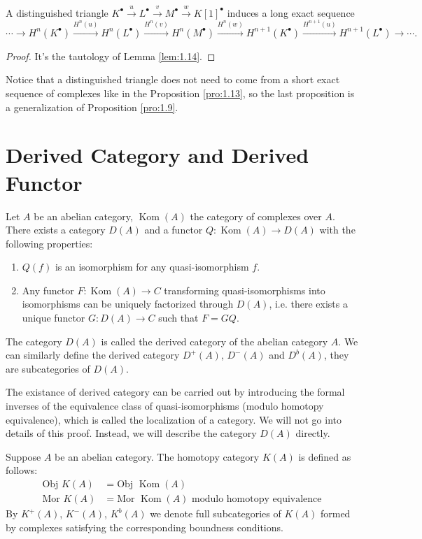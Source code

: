 \begin{pro}
	A distinguished triangle $K^\bullet \xrightarrow{u}L^\bullet\xrightarrow{v}M^\bullet 
	\xrightarrow{w}K[1]^\bullet$ induces a long exact sequence
	\[
		\cdots\to H^n(K^\bullet)\xrightarrow{H^n(u)}H^n(L^\bullet)\xrightarrow{H^n(v)}H^n(M^\bullet)\xrightarrow{H^n(w)}H^{n+1}(K^\bullet)\xrightarrow{H^{n+1}(u)}H^{n+1}(L^\bullet)\to\cdots.
	\]
\end{pro}

\begin{proof}
	It's the tautology of Lemma \ref{lem:1.14}.
\end{proof}

Notice that a distinguished triangle does not need to come from a short exact sequence of complexes like in the Proposition \ref{pro:1.13}, so the last proposition is a generalization of Proposition \ref{pro:1.9}.

\section{Derived Category and Derived Functor}

\begin{definition}
	Let $A$ be an abelian category, $\operatorname{Kom}(A)$ the 
	category of complexes over $A$. There exists a category 
	$D(A)$ and a functor $Q:\operatorname{Kom}(A)\to D(A)$
	with the following properties:
	\begin{enumerate}
		\item $Q(f)$ is an isomorphism for any quasi-isomorphism $f$.
		\item Any functor $F:\operatorname{Kom}(A)\to C$ transforming
			quasi-isomorphisms into isomorphisms can be uniquely
			factorized through $D(A)$, i.e. there exists a unique 
			functor $G:D(A)\to C$ such that $F=GQ$.
	\end{enumerate}
	The category $D(A)$ is called the derived category of the abelian
	category $A$. We can similarly define the derived category $D^+(A)$, $D^-(A)$ and 
	$D^b(A)$, they are subcategories of $D(A)$.
\end{definition}

The existance of derived category can be carried out by introducing 
the formal inverses of the equivalence class of quasi-isomorphisms 
(modulo homotopy equivalence), which is called the 
localization of a category. We will not go into details of this proof.
Instead, we will describe the category $D(A)$ directly.

\begin{definition}
	Suppose $A$ be an abelian category. The homotopy category $K(A)$ is defined as follows:
	\[
		\begin{aligned}
			\text{Obj $K(A)$} &= \text{Obj $\operatorname{Kom}(A)$}\\
			\text{Mor $K(A)$} &= \text{Mor $\operatorname{Kom}(A)$ modulo homotopy equivalence}
		\end{aligned}
	\]
	By $K^+(A)$, $K^-(A)$, $K^b(A)$ we denote full subcategories of $K(A)$ formed by complexes satisfying the corresponding boundness conditions.
\end{definition}

